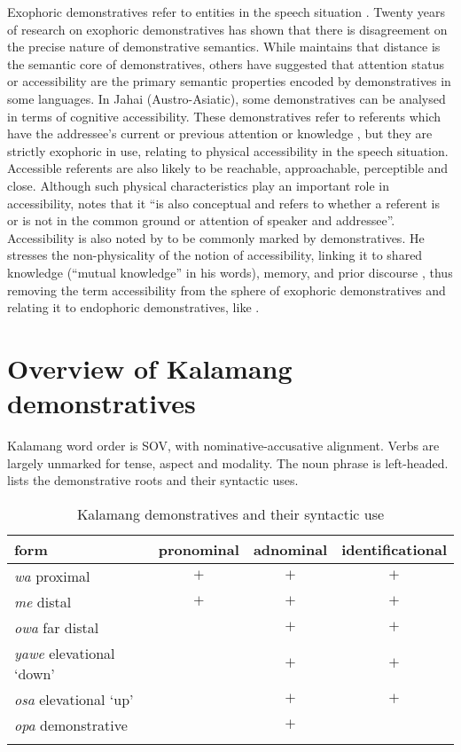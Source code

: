\documentclass[output=paper,colorlinks,citecolor=brown]{langscibook}
\begin{document}
Exophoric demonstratives refer to entities in the speech situation \citep[33]{HallidayHasan1976}. Twenty years of research on exophoric demonstratives has shown that there is disagreement on the precise nature of demonstrative semantics. While \cite{Diessel2006} maintains that distance is the semantic core of demonstratives, others have suggested that attention status \citep{Ozyurek1998} or accessibility \citep{Burenhult2003} are the primary semantic properties encoded by demonstratives in some languages. In Jahai (Austro-Asiatic), some demonstratives can be analysed in terms of cognitive accessibility. These demonstratives refer to referents which have the addressee's current or previous attention or knowledge \citep[366]{Burenhult2003}, but they are strictly exophoric in use, relating to physical accessibility in the speech situation. Accessible referents are also likely to be reachable, approachable, perceptible and close. Although such physical characteristics play an important role in accessibility, \cite[31]{Levinson2018} notes that it ``is also conceptual and refers to whether a referent is or is not in the common ground or attention of speaker and addressee''. Accessibility is also noted by \cite{Hanks2005,Hanks2011} to be commonly marked by demonstratives. He stresses the non-physicality of the notion of accessibility, linking it to shared knowledge (``mutual knowledge'' in his words), memory, and prior discourse \citep{Hanks2005}, thus removing the term accessibility from the sphere of exophoric demonstratives and relating it to endophoric demonstratives, like \cite{Levinson2018}.


\section{Overview of Kalamang demonstratives}
\label{sec:overv}
Kalamang word order is SOV, with nominative-accusative alignment. Verbs are largely unmarked for tense, aspect and modality. The noun phrase is left-headed.  lists the demonstrative roots and their syntactic uses.

\begin{table}
	\caption{Kalamang demonstratives and their syntactic use}
	\label{tab:demwc}
	\begin{tabular}{l ccc}
		\lsptoprule 
		form&pronominal&adnominal&identificational\\
		\midrule
		\textit{wa} proximal& $+$ & $+$ & $+$\\
		\textit{me} distal&  $+$ & $+$ & $+$\\
		\textit{owa} far distal&&$+$&$+$\\
		\textit{yawe} elevational `down'&&$+$&$+$\\
		\textit{osa} elevational `up'&&$+$&$+$\\
		\textit{opa} demonstrative &  & $+$&\\ 
		\lspbottomrule	
	\end{tabular}
\end{table}
\end{document}
